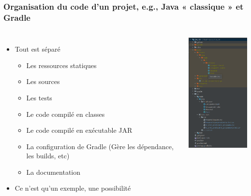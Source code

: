 \documentclass{beamer}
\begin{document}
    \begin{frame}
        \transdissolve
        \frametitle{Organisation du code d'un projet, e.g., Java « classique » et Gradle }

        \begin{columns}

            \begin{itemize}

                \item Tout est séparé
                \begin{itemize}
                    \item Les ressources statiques
                    \item Les sources
                    \item Les tests
                    \item Le code compilé en classes
                    \item Le code compilé en exécutable JAR
                    \item La configuration de Gradle (Gère les dépendance, les builds, etc)
                    \item La documentation
                \end{itemize}
                \item Ce n'est qu'un exemple, une possibilité

            \end{itemize}


            \centering
            \includegraphics[width=4cm]{image/java-gradle-project-structure.png}

        \end{columns}

    \end{frame}
\end{document}
